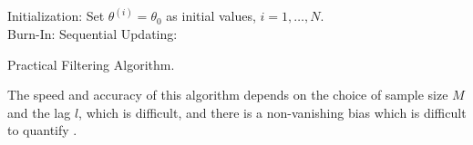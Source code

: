 \begin{algorithm}[h]
\SetAlgoLined 
Initialization: Set $\theta^{(i)}=\theta_0$ as initial values, $i=1,\ldots,N$.  \\
Burn-In: 
Sequential Updating: 
 \caption{Practical Filtering Algorithm.}\label{algorithmPraticalFilter}
\end{algorithm}

The speed and accuracy of this algorithm depends on the choice of sample size $M$ and the lag $l$, which is difficult, and there is a non-vanishing bias which is difficult to quantify \cite{polson2008practical} \cite{kantas2009overview}.




